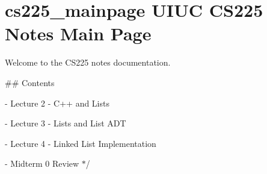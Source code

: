 \chapter{cs225\+\_\+mainpage UIUC CS225 Notes Main Page }
\hypertarget{index}{}\label{index}

\begin{DoxyItemize}
\item 
\item Welcome to the CS225 notes documentation.
\item 
\item \#\# Contents
\item -\/ Lecture 2 -\/ C++ and Lists
\item -\/ Lecture 3 -\/ Lists and List ADT
\item -\/ Lecture 4 -\/ Linked List Implementation
\item -\/ Midterm 0 Review \texorpdfstring{$\ast$}{*}/ 
\end{DoxyItemize}